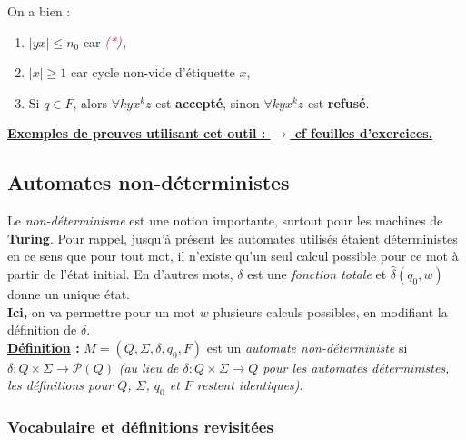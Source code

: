 \documentclass{article}
\newcommand{\titre}[1]{\textcolor{title}{#1}}
\newcommand{\tssect}[1]{\titre{\subsection{#1}}}
\newcommand{\tsssect}[1]{\titre{\subsubsection{#1}}}
\newcommand{\term}[1]{\textit{\textcolor{maintitle}{#1}}}
\begin{document}
\begin{sffamily}
\begin{enumerate}
On a bien :
\begin{enumerate}
\item $|yx| \leq n_0$ car $\term{(*)}$,
\item $|x| \geq 1$ car cycle non-vide d'étiquette $x$,
\item Si $q\in F$, alors $\forall k yx^kz$ est \textbf{accepté}, sinon $\forall k yx^kz$ est \textbf{refusé}.\\
\end{enumerate}

\textbf{\underline{Exemples de preuves utilisant cet outil : $\rightarrow$ cf feuilles d'exercices.}}

\end{enumerate}

\tssect{Automates non-déterministes}

Le \term{non-déterminisme} est une notion importante, surtout pour les machines de \textbf{Turing}. Pour rappel, 
jusqu'à présent les automates utilisés étaient déterministes en ce sens que pour tout mot, il n'existe qu'un seul 
calcul possible pour ce mot à partir de l'état initial. En d'autres mots, $\delta$ est une \term{fonction totale} 
et $\hat{\delta}(q_0,w)$ donne un unique état.\\
\textbf{Ici,} on va permettre pour un mot $w$ plusieurs calculs possibles, en modifiant la définition de $\delta$.\\

\textbf{\underline{Définition} :} $M=(Q,\Sigma,\delta,q_0,F)$ est un \term{automate non-déterministe} si $\delta : 
Q\times \Sigma \to \mathcal{P}(Q)$ \textit{(au lieu de $\delta : Q\times \Sigma \to Q$ pour les automates 
déterministes, les définitions pour $Q$, $\Sigma$, $q_0$ et $F$ restent identiques)}.

\tsssect{Vocabulaire et définitions revisitées}


\end{sffamily}
\end{document}
